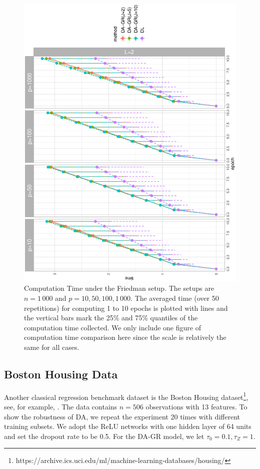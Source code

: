 \documentclass[ba]{imsart}
\numberwithin{equation}{section}
\theoremstyle{plain}
\begin{document}
\begin{figure}[!ht]
\begin{center}
\includegraphics[height=0.95\textwidth,angle=270]{fig/friedman_time_1000_L2_adam.eps}
\end{center}
\vspace{-0.15in}
\caption{Computation Time under the Friedman setup. The setups are $n=1\,000$ and $p=10, 50, 100, 1\,000$.  The averaged time (over 50 repetitions) for computing 1 to 10 epochs is plotted with lines and the vertical bars mark the 25\% and 75\% quantiles of the computation time collected.  We only include one figure of computation time comparison here since the scale is relatively the same for all cases.}\label{fig:comp}
\vspace{-0.15in}
\end{figure}

\subsection{Boston Housing Data}
Another classical regression benchmark dataset is the Boston Housing dataset\footnote{https://archive.ics.uci.edu/ml/machine-learning-databases/housing/}, see, for example, \citet{hernandez2015probabilistic}.
The data contains $n=506$ observations with 13 features. %
 To show the robustness of DA, we repeat the experiment 20 times with different training subsets. We adopt the ReLU networks with one hidden layer of 64 units and set the dropout rate to be 0.5. For the DA-GR model, we let $\tau_0=0.1, \tau_Z=1$.
\end{document}
